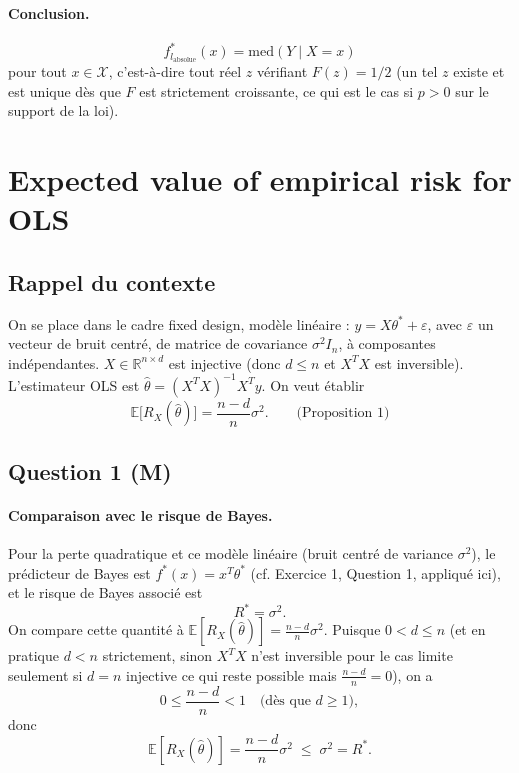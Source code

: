 \documentclass[11pt]{article}
\theoremstyle{remark}
\newcommand{\X}{\mathcal{X}}
\newcommand{\E}{\mathbb{E}}
\newcommand{\R}{\mathbb{R}}
\begin{document}
\paragraph{Conclusion.}
\[
  \boxed{f^*_{l_{\text{absolue}}}(x) = \mathrm{med}(Y \mid X = x)}
\]
pour tout $x \in \X$, c'est-à-dire tout réel $z$ vérifiant $F(z) = 1/2$ (un tel $z$ existe et est unique dès que $F$ est strictement croissante, ce qui est le cas si $p > 0$ sur le support de la loi).

\section{Expected value of empirical risk for OLS}

\subsection*{Rappel du contexte}

On se place dans le cadre fixed design, modèle linéaire : $y = X\theta^* + \varepsilon$, avec $\varepsilon$ un vecteur de bruit centré, de matrice de covariance $\sigma^2 I_n$, à composantes indépendantes. $X \in \R^{n \times d}$ est injective (donc $d \leq n$ et $X^TX$ est inversible). L'estimateur OLS est $\hat\theta = (X^TX)^{-1}X^Ty$. On veut établir
\[
  \E\big[R_X(\hat\theta)\big] = \frac{n-d}{n}\sigma^2. \qquad \text{(Proposition 1)}
\]

\subsection*{Question 1 (M)}

\paragraph{Comparaison avec le risque de Bayes.}
Pour la perte quadratique et ce modèle linéaire (bruit centré de variance $\sigma^2$), le prédicteur de Bayes est $f^*(x) = x^T\theta^*$ (cf. Exercice 1, Question 1, appliqué ici), et le risque de Bayes associé est
\[
  R^* = \sigma^2.
\]
On compare cette quantité à $\E[R_X(\hat\theta)] = \frac{n-d}{n}\sigma^2$. Puisque $0 < d \leq n$ (et en pratique $d<n$ strictement, sinon $X^TX$ n'est inversible pour le cas limite seulement si $d=n$ injective ce qui reste possible mais $\frac{n-d}{n}=0$), on a
\[
  0 \leq \frac{n-d}{n} < 1 \quad \text{(dès que } d \geq 1\text{)},
\]
donc
\[
  \boxed{\E[R_X(\hat\theta)] = \frac{n-d}{n}\sigma^2 \;\leq\; \sigma^2 = R^*}.
\]
\end{document}
